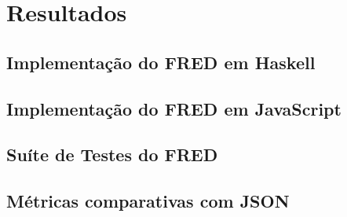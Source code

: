 \chapter[Resultados]{Resultados}

\section{Implementação do FRED em Haskell}

\section{Implementação do FRED em JavaScript}

\section{Suíte de Testes do FRED}

\section{Métricas comparativas com JSON}